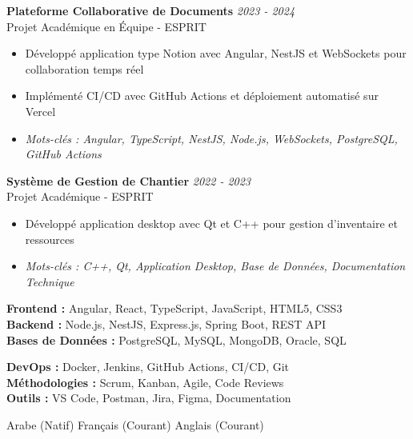 \documentclass[11pt,a4paper]{article}
\begin{document}

\textbf{Plateforme Collaborative de Documents} \hfill \textit{2023 - 2024}\\[-2pt]
Projet Académique en Équipe - ESPRIT\\[-5pt]
\begin{itemize}[leftmargin=8pt,itemsep=1pt,topsep=2pt]
  \item Développé application type Notion avec Angular, NestJS et WebSockets pour collaboration temps réel
  \item Implémenté CI/CD avec GitHub Actions et déploiement automatisé sur Vercel
  \item[] \textit{\footnotesize Mots-clés : Angular, TypeScript, NestJS, Node.js, WebSockets, PostgreSQL, GitHub Actions}
\end{itemize}\vspace{3pt}

\textbf{Système de Gestion de Chantier} \hfill \textit{2022 - 2023}\\[-2pt]
Projet Académique - ESPRIT\\[-5pt]
\begin{itemize}[leftmargin=8pt,itemsep=1pt,topsep=2pt]
  \item Développé application desktop avec Qt et C++ pour gestion d'inventaire et ressources
  \item[] \textit{\footnotesize Mots-clés : C++, Qt, Application Desktop, Base de Données, Documentation Technique}
\end{itemize}\vspace{3pt}

{\small
\begin{minipage}[t]{0.48\textwidth}
  \textbf{Frontend :} Angular, React, TypeScript, JavaScript, HTML5, CSS3\\[1.5pt]
  \textbf{Backend :} Node.js, NestJS, Express.js, Spring Boot, REST API\\[1.5pt]
  \textbf{Bases de Données :} PostgreSQL, MySQL, MongoDB, Oracle, SQL
\end{minipage}
\hfill
\begin{minipage}[t]{0.48\textwidth}
  \textbf{DevOps :} Docker, Jenkins, GitHub Actions, CI/CD, Git\\[1.5pt]
  \textbf{Méthodologies :} Scrum, Kanban, Agile, Code Reviews\\[1.5pt]
  \textbf{Outils :} VS Code, Postman, Jira, Figma, Documentation
\end{minipage}
}

Arabe (Natif) \textbar{} Français (Courant) \textbar{} Anglais (Courant)
\end{document}
